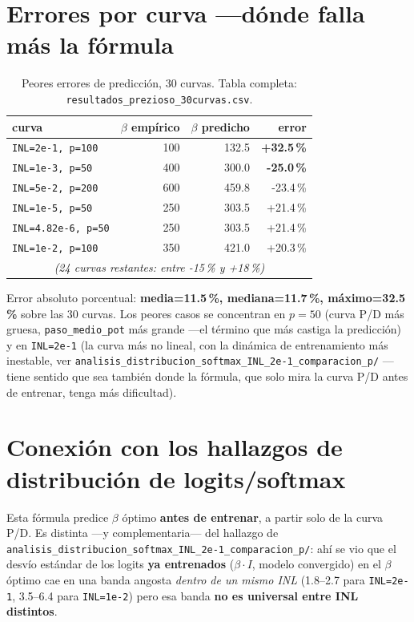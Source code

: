 \documentclass[11pt]{article}
\begin{document}
\section{Errores por curva —dónde falla más la fórmula}

\begin{table}[htb]
\centering
\begin{tabular}{@{}lrrr@{}}
\toprule
curva & $\beta$ empírico & $\beta$ predicho & error \\
\midrule
\texttt{INL=2e-1, p=100}   & 100 & 132.5 & \textbf{+32.5\,\%} \\
\texttt{INL=1e-3, p=50}    & 400 & 300.0 & \textbf{-25.0\,\%} \\
\texttt{INL=5e-2, p=200}   & 600 & 459.8 & -23.4\,\% \\
\texttt{INL=1e-5, p=50}    & 250 & 303.5 & +21.4\,\% \\
\texttt{INL=4.82e-6, p=50} & 250 & 303.5 & +21.4\,\% \\
\texttt{INL=1e-2, p=100}   & 350 & 421.0 & +20.3\,\% \\
\multicolumn{4}{c}{\emph{(24 curvas restantes: entre -15\,\% y +18\,\%)}} \\
\bottomrule
\end{tabular}
\caption{Peores errores de predicción, 30 curvas. Tabla completa:
\texttt{resultados\_prezioso\_30curvas.csv}.}
\end{table}

Error absoluto porcentual: \textbf{media=11.5\,\%, mediana=11.7\,\%,
máximo=32.5\,\%} sobre las 30 curvas. Los peores casos se concentran en
$p=50$ (curva P/D más gruesa, \texttt{paso\_medio\_pot} más grande —el
término que más castiga la predicción) y en \texttt{INL=2e-1} (la curva
más no lineal, con la dinámica de entrenamiento más inestable, ver
\texttt{analisis\_distribucion\_softmax\_INL\_2e-1\_comparacion\_p/}
—tiene sentido que sea también donde la fórmula, que solo mira la curva
P/D antes de entrenar, tenga más dificultad).

\section{Conexión con los hallazgos de distribución de logits/softmax}

Esta fórmula predice $\beta$ óptimo \textbf{antes de entrenar}, a partir
solo de la curva P/D. Es distinta —y complementaria— del hallazgo de
\texttt{analisis\_distribucion\_softmax\_INL\_2e-1\_comparacion\_p/}: ahí
se vio que el desvío estándar de los logits \textbf{ya entrenados}
($\beta\cdot I$, modelo convergido) en el $\beta$ óptimo cae en una banda
angosta \emph{dentro de un mismo INL} (1.8--2.7 para \texttt{INL=2e-1},
3.5--6.4 para \texttt{INL=1e-2}) pero esa banda \textbf{no es universal
entre INL distintos}.
\end{document}
